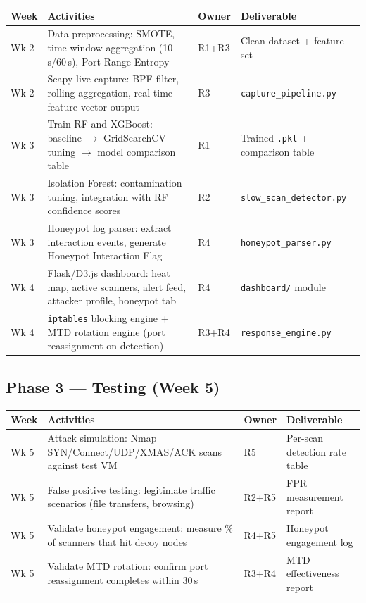 \documentclass[12pt,a4paper]{article}
\begin{document}
\begin{table}[h!]
\centering
\small
\begin{tabular}{C{1.2cm} L{7.5cm} C{1.5cm} L{3.5cm}}
  \toprule
  \textbf{Week} & \textbf{Activities} & \textbf{Owner} & \textbf{Deliverable} \\
  \midrule
  Wk 2 & Data preprocessing: SMOTE, time-window aggregation (10\,s/60\,s), Port Range Entropy & R1+R3 & Clean dataset + feature set \\
  Wk 2 & Scapy live capture: BPF filter, rolling aggregation, real-time feature vector output & R3 & \texttt{capture\_pipeline.py} \\
  Wk 3 & Train RF and XGBoost: baseline $\rightarrow$ GridSearchCV tuning $\rightarrow$ model comparison table & R1 & Trained \texttt{.pkl} + comparison table \\
  Wk 3 & Isolation Forest: contamination tuning, integration with RF confidence scores & R2 & \texttt{slow\_scan\_detector.py} \\
  Wk 3 & Honeypot log parser: extract interaction events, generate Honeypot Interaction Flag & R4 & \texttt{honeypot\_parser.py} \\
  Wk 4 & Flask/D3.js dashboard: heat map, active scanners, alert feed, attacker profile, honeypot tab & R4 & \texttt{dashboard/} module \\
  Wk 4 & \texttt{iptables} blocking engine + MTD rotation engine (port reassignment on detection) & R3+R4 & \texttt{response\_engine.py} \\
  \bottomrule
\end{tabular}
\end{table}

\subsection*{Phase 3 --- Testing (Week 5)}

\begin{table}[h!]
\centering
\small
\begin{tabular}{C{1.2cm} L{7.5cm} C{1.5cm} L{3.5cm}}
  \toprule
  \textbf{Week} & \textbf{Activities} & \textbf{Owner} & \textbf{Deliverable} \\
  \midrule
  Wk 5 & Attack simulation: Nmap SYN/Connect/UDP/XMAS/ACK scans against test VM & R5 & Per-scan detection rate table \\
  Wk 5 & False positive testing: legitimate traffic scenarios (file transfers, browsing) & R2+R5 & FPR measurement report \\
  Wk 5 & Validate honeypot engagement: measure \% of scanners that hit decoy nodes & R4+R5 & Honeypot engagement log \\
  Wk 5 & Validate MTD rotation: confirm port reassignment completes within 30\,s & R3+R4 & MTD effectiveness report \\
  \bottomrule
\end{tabular}
\end{table}
\end{document}
